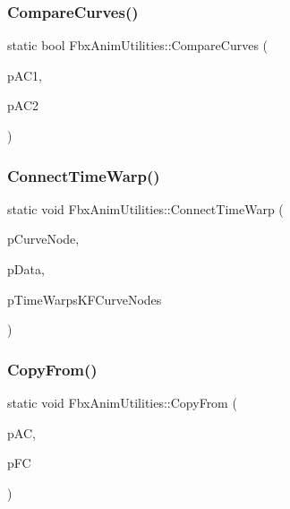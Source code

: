 \subsubsection{\texorpdfstring{Compare\+Curves()}{CompareCurves()}}
{\footnotesize\ttfamily static bool Fbx\+Anim\+Utilities\+::\+Compare\+Curves (\begin{DoxyParamCaption}\item[{\hyperlink{class_fbx_anim_curve}{Fbx\+Anim\+Curve} $\ast$}]{p\+A\+C1,  }\item[{\hyperlink{class_fbx_anim_curve}{Fbx\+Anim\+Curve} $\ast$}]{p\+A\+C2 }\end{DoxyParamCaption})\hspace{0.3cm}{\ttfamily [static]}}

\mbox{\label{class_fbx_anim_utilities_a3e8dfa1d4331e466d3add2c9cc4dd845}} 
\subsubsection{\texorpdfstring{Connect\+Time\+Warp()}{ConnectTimeWarp()}}
{\footnotesize\ttfamily static void Fbx\+Anim\+Utilities\+::\+Connect\+Time\+Warp (\begin{DoxyParamCaption}\item[{\hyperlink{class_fbx_anim_curve_node}{Fbx\+Anim\+Curve\+Node} $\ast$}]{p\+Curve\+Node,  }\item[{\hyperlink{class_fbx_anim_utilities_1_1_curve_node_intfce}{Curve\+Node\+Intfce} \&}]{p\+Data,  }\item[{\hyperlink{class_fbx_multi_map}{Fbx\+Multi\+Map} \&}]{p\+Time\+Warps\+K\+F\+Curve\+Nodes }\end{DoxyParamCaption})\hspace{0.3cm}{\ttfamily [static]}}

\mbox{\label{class_fbx_anim_utilities_accddd7a975ab0eb0f042903846a14704}} 
\subsubsection{\texorpdfstring{Copy\+From()}{CopyFrom()}}
{\footnotesize\ttfamily static void Fbx\+Anim\+Utilities\+::\+Copy\+From (\begin{DoxyParamCaption}\item[{\hyperlink{class_fbx_anim_curve}{Fbx\+Anim\+Curve} $\ast$}]{p\+AC,  }\item[{\hyperlink{class_fbx_anim_utilities_1_1_curve_intfce}{Curve\+Intfce} \&}]{p\+FC }\end{DoxyParamCaption})\hspace{0.3cm}{\ttfamily [static]}}

